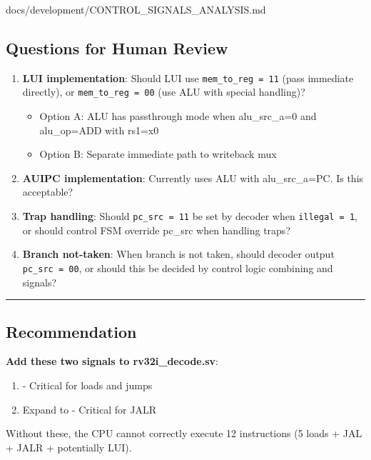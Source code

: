 \begin{relocated}{docs/development/CONTROL_SIGNALS_ANALYSIS.md}
\subsection{Questions for Human Review}\label{tm:flow:control-signals-analysis:questions-for-human-review}

\begin{enumerate}
\def\labelenumi{\arabic{enumi}.}
\item
  \textbf{LUI implementation}: Should LUI use
  \texttt{mem\_\allowbreak{}to\_\allowbreak{}reg\ =\allowbreak{}\ 11}
  (pass immediate directly), or
  \texttt{mem\_\allowbreak{}to\_\allowbreak{}reg\ =\allowbreak{}\ 00}
  (use ALU with special handling)?

  \begin{itemize}
  \tightlist
  \item
    Option A: ALU has passthrough mode when
    alu\_\allowbreak{}src\_\allowbreak{}a=0 and alu\_\allowbreak{}op=ADD
    with rs1=x0
  \item
    Option B: Separate immediate path to writeback mux
  \end{itemize}
\item
  \textbf{AUIPC implementation}: Currently uses ALU with
  alu\_\allowbreak{}src\_\allowbreak{}a=PC. Is this acceptable?
\item
  \textbf{Trap handling}: Should
  \texttt{pc\_\allowbreak{}src\ =\allowbreak{}\ 11} be set by decoder
  when \texttt{illegal\ =\allowbreak{}\ 1}, or should control FSM
  override pc\_src when handling traps?
\item
  \textbf{Branch not-taken}: When branch is not taken, should decoder
  output \texttt{pc\_\allowbreak{}src\ =\allowbreak{}\ 00}, or should
  this be decided by control logic combining  and
   signals?
\end{enumerate}

\begin{center}\rule{0.5\linewidth}{0.5pt}\end{center}

\subsection{Recommendation}\label{tm:flow:control-signals-analysis:recommendation}

\textbf{Add these two signals to rv32i\_\allowbreak{}decode.sv}:

\begin{enumerate}
\def\labelenumi{\arabic{enumi}.}
\tightlist
\item
   - Critical for loads and jumps
\item
  Expand  to  - Critical for JALR
\end{enumerate}

Without these, the CPU cannot correctly execute 12 instructions (5 loads
+ JAL + JALR + potentially LUI).
\end{relocated}


